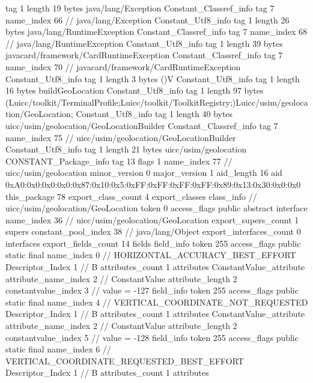 {{{			tag	1
			length	19
			bytes	java/lang/Exception
		}
		Constant_Classref_info {
			tag	7
			name_index	66		// java/lang/Exception
		}
		Constant_Utf8_info {
			tag	1
			length	26
			bytes	java/lang/RuntimeException
		}
		Constant_Classref_info {
			tag	7
			name_index	68		// java/lang/RuntimeException
		}
		Constant_Utf8_info {
			tag	1
			length	39
			bytes	javacard/framework/CardRuntimeException
		}
		Constant_Classref_info {
			tag	7
			name_index	70		// javacard/framework/CardRuntimeException
		}
		Constant_Utf8_info {
			tag	1
			length	3
			bytes	()V
		}
		Constant_Utf8_info {
			tag	1
			length	16
			bytes	buildGeoLocation
		}
		Constant_Utf8_info {
			tag	1
			length	97
			bytes	(Luicc/toolkit/TerminalProfile;Luicc/toolkit/ToolkitRegistry;)Luicc/usim/geolocation/GeoLocation;
		}
		Constant_Utf8_info {
			tag	1
			length	40
			bytes	uicc/usim/geolocation/GeoLocationBuilder
		}
		Constant_Classref_info {
			tag	7
			name_index	75		// uicc/usim/geolocation/GeoLocationBuilder
		}
		Constant_Utf8_info {
			tag	1
			length	21
			bytes	uicc/usim/geolocation
		}
		CONSTANT_Package_info {
			tag	13
			flags	1
			name_index	77		// uicc/usim/geolocation
			minor_version	0
			major_version	1
			aid_length	16
			aid	0xA0:0x0:0x0:0x0:0x87:0x10:0x5:0xFF:0xFF:0xFF:0xFF:0x89:0x13:0x30:0x0:0x0
		}
	}
	this_package	78
	export_class_count	4
	export_classes {
		class_info {		// uicc/usim/geolocation/GeoLocation
			token	0
			access_flags	public abstract interface
			name_index	36		// uicc/usim/geolocation/GeoLocation
			export_supers_count	1
			supers {
				constant_pool_index	38		// java/lang/Object
			}
			export_interfaces_count	0
			interfaces {
			}
			export_fields_count	14
			fields {
			field_info {
				token	255
				access_flags	public static final
				name_index	0		// HORIZONTAL_ACCURACY_BEST_EFFORT
				Descriptor_Index	1		// B
				attributes_count	1
				attributes {
				ConstantValue_attribute {
					attribute_name_index	2		// ConstantValue
					attribute_length	2
					constantvalue_index	3		// value = -127
				}
				}
			}
			field_info {
				token	255
				access_flags	public static final
				name_index	4		// VERTICAL_COORDINATE_NOT_REQUESTED
				Descriptor_Index	1		// B
				attributes_count	1
				attributes {
				ConstantValue_attribute {
					attribute_name_index	2		// ConstantValue
					attribute_length	2
					constantvalue_index	5		// value = -128
				}
				}
			}
			field_info {
				token	255
				access_flags	public static final
				name_index	6		// VERTICAL_COORDINATE_REQUESTED_BEST_EFFORT
				Descriptor_Index	1		// B
				attributes_count	1
				attributes {
}}}}}}
